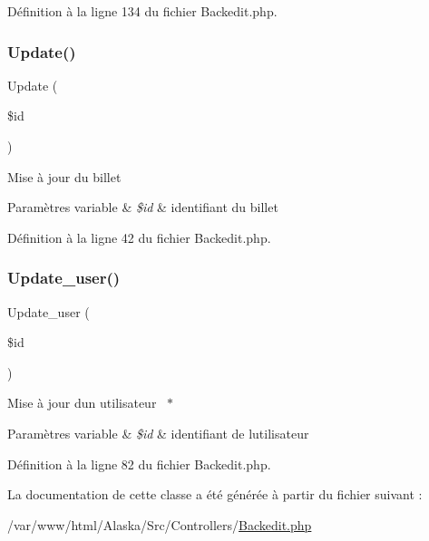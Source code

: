 Définition à la ligne 134 du fichier Backedit.\+php.

\mbox{\label{class_src_1_1_controllers_1_1_backedit_a82232b33fbfacdbdb8a8f49acaecf564}} 
\subsubsection{\texorpdfstring{Update()}{Update()}}
{\footnotesize\ttfamily Update (\begin{DoxyParamCaption}\item[{}]{\$id }\end{DoxyParamCaption})}

Mise à jour du billet 
\begin{DoxyParams}[1]{Paramètres}
variable & {\em \$id} & identifiant du billet \\
\hline
\end{DoxyParams}


Définition à la ligne 42 du fichier Backedit.\+php.

\mbox{\label{class_src_1_1_controllers_1_1_backedit_ac76a9db7f422d94f155c99c21540da0e}} 
\subsubsection{\texorpdfstring{Update\+\_\+user()}{Update\_user()}}
{\footnotesize\ttfamily Update\+\_\+user (\begin{DoxyParamCaption}\item[{}]{\$id }\end{DoxyParamCaption})}

Mise à jour d\textquotesingle{}un utilisateur  $\ast$
\begin{DoxyParams}[1]{Paramètres}
variable & {\em \$id} & identifiant de l\textquotesingle{}utilisateur \\
\hline
\end{DoxyParams}


Définition à la ligne 82 du fichier Backedit.\+php.



La documentation de cette classe a été générée à partir du fichier suivant \+:\begin{DoxyCompactItemize}
\item 
/var/www/html/\+Alaska/\+Src/\+Controllers/\hyperlink{_backedit_8php}{Backedit.\+php}\end{DoxyCompactItemize}
